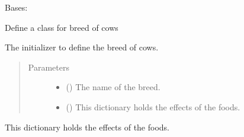 \documentclass[letterpaper,10pt,english]{sphinxmanual}
\begin{document}
\begin{fulllineitems}
\label{\detokenize{farming:farming.part3_fertilizer.Breed}}
\sphinxAtStartPar
Bases: 

\sphinxAtStartPar
Define a class for breed of cows

\sphinxAtStartPar
The initializer to define the breed of cows.
\begin{quote}\begin{description}
\item[{Parameters}] \leavevmode\begin{itemize}
\item {} 
\sphinxAtStartPar
{} () \textendash{} The name of the breed.

\item {} 
\sphinxAtStartPar
{} () \textendash{} This dictionary holds the effects of the foods.

\end{itemize}

\end{description}\end{quote}

\begin{fulllineitems}
\label{\detokenize{farming:farming.part3_fertilizer.Breed.food_effects}}
\sphinxAtStartPar
This dictionary holds the effects of the foods.

\end{fulllineitems}



\end{fulllineitems}
\end{document}
